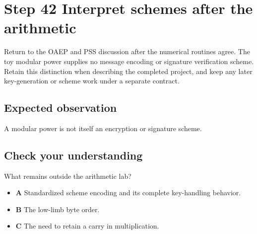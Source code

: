 \section{Step 42 Interpret schemes after the arithmetic}\label{rsa-s42}

Return to the OAEP and PSS discussion after the numerical routines agree. The toy modular power supplies no message encoding or signature verification scheme. Retain this distinction when describing the completed project, and keep any later key-generation or scheme work under a separate contract.

\subsection{Expected observation}
A modular power is not itself an encryption or signature scheme.

\subsection{Check your understanding}
What remains outside the arithmetic lab?

\begin{itemize}
  \item \textbf{A} Standardized scheme encoding and its complete key-handling behavior.
  \item \textbf{B} The low-limb byte order.
  \item \textbf{C} The need to retain a carry in multiplication.
\end{itemize}
